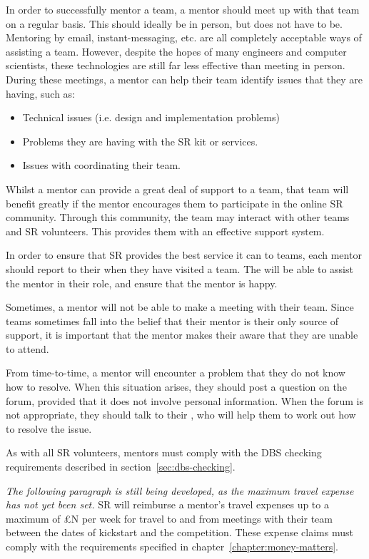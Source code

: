 In order to successfully mentor a team, a mentor should meet up with that team on a regular basis.  This should ideally be in person, but does not have to be.  Mentoring by email, instant-messaging, etc. are all completely acceptable ways of assisting a team.  However, despite the hopes of many engineers and computer scientists, these technologies are still far less effective than meeting in person.  During these meetings, a mentor can help their team identify issues that they are having, such as:
\begin{itemize}
\item Technical issues (i.e. design and implementation problems)
\item Problems they are having with the SR kit or services.
\item Issues with coordinating their team.
\end{itemize}

Whilst a mentor can provide a great deal of support to a team, that team will benefit greatly if the mentor encourages them to participate in the online SR community.  Through this community, the team may interact with other teams and SR volunteers.  This provides them with an effective support system.

In order to ensure that SR provides the best service it can to teams, each mentor should report to their  when they have visited a team.  The  will be able to assist the mentor in their role, and ensure that the mentor is happy.

Sometimes, a mentor will not be able to make a meeting with their team.  Since teams sometimes fall into the belief that their mentor is their only source of support, it is important that the mentor makes their  aware that they are unable to attend.

From time-to-time, a mentor will encounter a problem that they do not know how to resolve.  When this situation arises, they should post a question on the forum, provided that it does not involve personal information.  When the forum is not appropriate, they should talk to their , who will help them to work out how to resolve the issue.

As with all SR volunteers, mentors must comply with the DBS checking requirements described in section~\ref{sec:dbs-checking}.

\textit{The following paragraph is still being developed, as the maximum travel expense has not yet been set.}  SR will reimburse a mentor's travel expenses up to a maximum of {\pounds}N per week for travel to and from meetings with their team between the dates of kickstart and the competition.  These expense claims must comply with the requirements specified in chapter~\ref{chapter:money-matters}.

